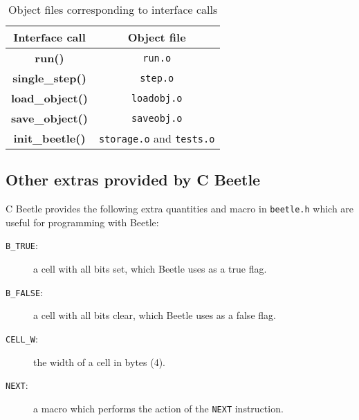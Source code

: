 \documentclass{article}
\begin{document}
\begin{table}
\begin{center}
\begin{tabular}{|c|c|} \hline
\rule[-2mm]{0mm}{6mm}\bf Interface call & \bf Object file \\ \hline
{\bf run()} & {\tt run.o} \\
{\bf single\_step()} & {\tt step.o} \\
{\bf load\_object()} & {\tt loadobj.o} \\
{\bf save\_object()} & {\tt saveobj.o} \\
{\bf init\_beetle()} & {\tt storage.o} and {\tt tests.o} \\  \hline
\end{tabular}
\caption{\label{objtable}Object files corresponding to interface calls}
\end{center}
\end{table}


\subsection{Other extras provided by C Beetle}

C Beetle provides the following extra quantities and macro in {\tt beetle.h}
which are useful for programming with Beetle:

\begin{description}
\item[{\tt B\_TRUE}:] a cell with all bits set, which Beetle uses as a true
flag.
\item[{\tt B\_FALSE}:] a cell with all bits clear, which Beetle uses as a
false flag.
\item[{\tt CELL\_W}:] the width of a cell in bytes (4).
\item[{\tt NEXT}:] a macro which performs the action of the {\tt NEXT}
instruction.
\end{description}




\end{document}
